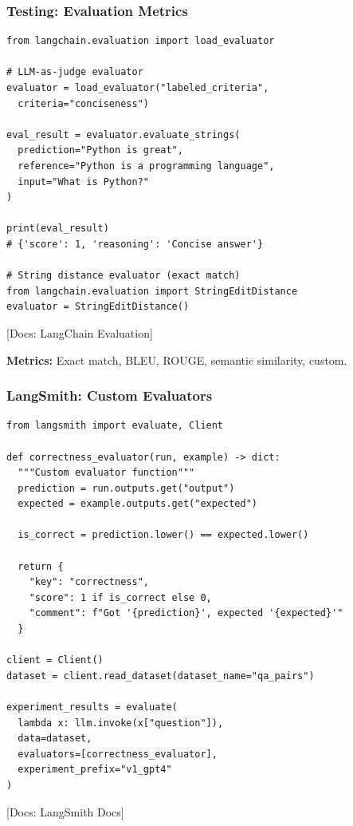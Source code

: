 \documentclass[aspectratio=169,11pt]{beamer}
\newcommand{\docref}[1]{{\scriptsize\color{docgray}[Docs: #1]}}
\begin{document}
\begin{frame}[fragile]
\frametitle{Testing: Evaluation Metrics}
\vspace{-0.3cm}

\begin{lstlisting}
from langchain.evaluation import load_evaluator

# LLM-as-judge evaluator
evaluator = load_evaluator("labeled_criteria",
  criteria="conciseness")

eval_result = evaluator.evaluate_strings(
  prediction="Python is great",
  reference="Python is a programming language",
  input="What is Python?"
)

print(eval_result)
# {'score': 1, 'reasoning': 'Concise answer'}

# String distance evaluator (exact match)
from langchain.evaluation import StringEditDistance
evaluator = StringEditDistance()
\end{lstlisting}

\docref{LangChain Evaluation}

\textbf{Metrics:} Exact match, BLEU, ROUGE, semantic similarity, custom.

\end{frame}

\begin{frame}[fragile,shrink=8]
\frametitle{LangSmith: Custom Evaluators}

\begin{lstlisting}
from langsmith import evaluate, Client

def correctness_evaluator(run, example) -> dict:
  """Custom evaluator function"""
  prediction = run.outputs.get("output")
  expected = example.outputs.get("expected")

  is_correct = prediction.lower() == expected.lower()

  return {
    "key": "correctness",
    "score": 1 if is_correct else 0,
    "comment": f"Got '{prediction}', expected '{expected}'"
  }

client = Client()
dataset = client.read_dataset(dataset_name="qa_pairs")

experiment_results = evaluate(
  lambda x: llm.invoke(x["question"]),
  data=dataset,
  evaluators=[correctness_evaluator],
  experiment_prefix="v1_gpt4"
)
\end{lstlisting}

\docref{LangSmith Docs}

\end{frame}
\end{document}
